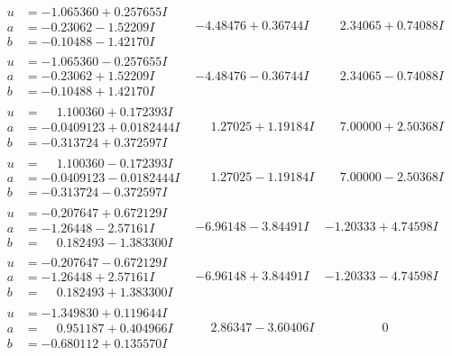 \documentclass[1p]{elsarticle_modified}
\theoremstyle{definition}
\begin{document}
$$\begin{array}{c|c|c}
\begin{aligned}
u &= -1.065360 + 0.257655 I \\
a &= -0.23062 - 1.52209 I \\
b &= -0.10488 - 1.42170 I\end{aligned}
 & -4.48476 + 0.36744 I & \phantom{-}2.34065 + 0.74088 I \\ \hline\begin{aligned}
u &= -1.065360 - 0.257655 I \\
a &= -0.23062 + 1.52209 I \\
b &= -0.10488 + 1.42170 I\end{aligned}
 & -4.48476 - 0.36744 I & \phantom{-}2.34065 - 0.74088 I \\ \hline\begin{aligned}
u &= \phantom{-}1.100360 + 0.172393 I \\
a &= -0.0409123 + 0.0182444 I \\
b &= -0.313724 + 0.372597 I\end{aligned}
 & \phantom{-}1.27025 + 1.19184 I & \phantom{-}7.00000 + 2.50368 I \\ \hline\begin{aligned}
u &= \phantom{-}1.100360 - 0.172393 I \\
a &= -0.0409123 - 0.0182444 I \\
b &= -0.313724 - 0.372597 I\end{aligned}
 & \phantom{-}1.27025 - 1.19184 I & \phantom{-}7.00000 - 2.50368 I \\ \hline\begin{aligned}
u &= -0.207647 + 0.672129 I \\
a &= -1.26448 - 2.57161 I \\
b &= \phantom{-}0.182493 - 1.383300 I\end{aligned}
 & -6.96148 - 3.84491 I & -1.20333 + 4.74598 I \\ \hline\begin{aligned}
u &= -0.207647 - 0.672129 I \\
a &= -1.26448 + 2.57161 I \\
b &= \phantom{-}0.182493 + 1.383300 I\end{aligned}
 & -6.96148 + 3.84491 I & -1.20333 - 4.74598 I \\ \hline\begin{aligned}
u &= -1.349830 + 0.119644 I \\
a &= \phantom{-}0.951187 + 0.404966 I \\
b &= -0.680112 + 0.135570 I\end{aligned}
 & \phantom{-}2.86347 - 3.60406 I & \phantom{-0.000000 } 0 \\ \hline\begin{aligned}

\end{aligned}
\end{array}$$
\end{document}
